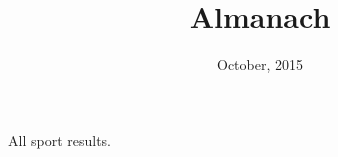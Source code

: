 \documentclass[a4paper,11pt]{report}
\title{ Almanach  }
\date{ October, 2015 }
\begin{document}
\maketitle

\tableofcontents

All sport results.
\end{document}
